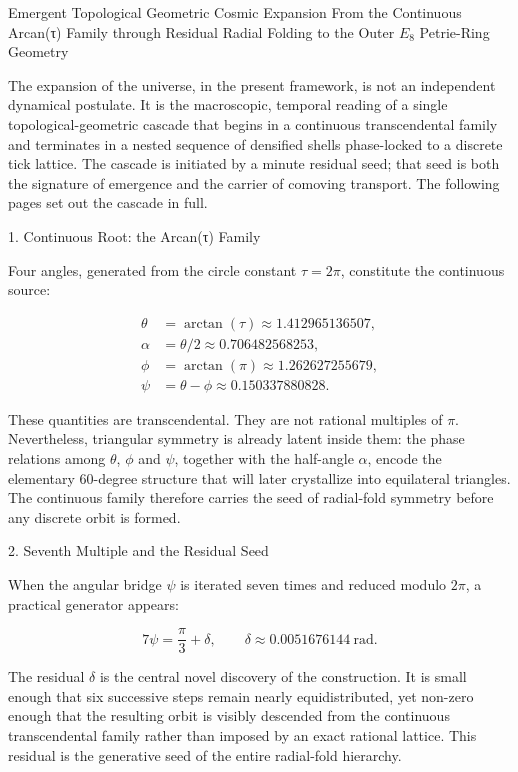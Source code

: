 Emergent Topological Geometric Cosmic Expansion  
From the Continuous Arcan(τ) Family through Residual Radial Folding to the Outer \(E_8\) Petrie-Ring Geometry

The expansion of the universe, in the present framework, is not an independent dynamical postulate. It is the macroscopic, temporal reading of a single topological-geometric cascade that begins in a continuous transcendental family and terminates in a nested sequence of densified shells phase-locked to a discrete tick lattice. The cascade is initiated by a minute residual seed; that seed is both the signature of emergence and the carrier of comoving transport. The following pages set out the cascade in full.

1. Continuous Root: the Arcan(τ) Family

Four angles, generated from the circle constant \(\tau=2\pi\), constitute the continuous source:

\[
\begin{align*}
\theta &= \arctan(\tau) \approx 1.412965136507,\\
\alpha &= \theta/2 \approx 0.706482568253,\\
\phi &= \arctan(\pi) \approx 1.262627255679,\\
\psi &= \theta-\phi \approx 0.150337880828.
\end{align*}
\]

These quantities are transcendental. They are not rational multiples of \(\pi\). Nevertheless, triangular symmetry is already latent inside them: the phase relations among \(\theta\), \(\phi\) and \(\psi\), together with the half-angle \(\alpha\), encode the elementary 60-degree structure that will later crystallize into equilateral triangles. The continuous family therefore carries the seed of radial-fold symmetry before any discrete orbit is formed.

2. Seventh Multiple and the Residual Seed

When the angular bridge \(\psi\) is iterated seven times and reduced modulo \(2\pi\), a practical generator appears:

\[
7\psi = \frac{\pi}{3}+\delta, \qquad \delta\approx0.0051676144\ \text{rad}.
\]

The residual \(\delta\) is the central novel discovery of the construction. It is small enough that six successive steps remain nearly equidistributed, yet non-zero enough that the resulting orbit is visibly descended from the continuous transcendental family rather than imposed by an exact rational lattice. This residual is the generative seed of the entire radial-fold hierarchy.

